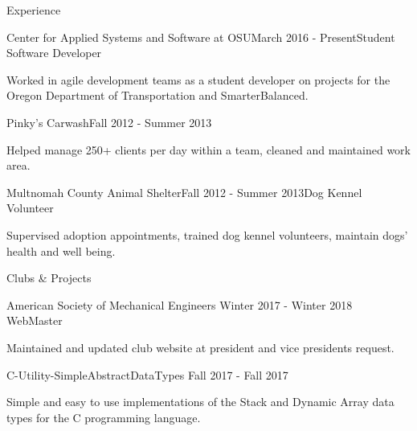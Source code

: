 \documentclass{resume} %
\begin{document}

\begin{rSection}{Experience}

  \begin{rSubsection}{Center for Applied Systems and Software at OSU}{March 2016 - Present}{Student Software Developer}{}
  \item Worked in agile development teams as a student developer on projects for the Oregon  Department of Transportation and SmarterBalanced.
  \end{rSubsection}

  \begin{rSubsection}{Pinky’s Carwash}{Fall 2012 - Summer 2013}{}{}
  \item Helped manage 250+ clients per day within a team, cleaned and maintained work area.
  \end{rSubsection}
  
  \begin{rSubsection}{Multnomah County Animal Shelter}{Fall 2012 - Summer 2013}{Dog Kennel Volunteer}{}
  \item Supervised adoption appointments, trained dog kennel volunteers, maintain dogs’ health and well being. 
  \end{rSubsection}

\end{rSection}


\begin{rSection}{Clubs \& Projects}
	\begin{rSubsection} {American Society of Mechanical Engineers} {Winter 2017 - Winter 2018} {WebMaster} {}
	\item Maintained and updated club website at president and vice presidents request.
	\end{rSubsection}
    
    \begin{rSubsection} {C-Utility-SimpleAbstractDataTypes} {Fall 2017 - Fall 2017} {} {}
    \item Simple and easy to use implementations of the Stack and Dynamic Array data types for the C programming language.
    \end{rSubsection}


\end{rSection}
\end{document}
